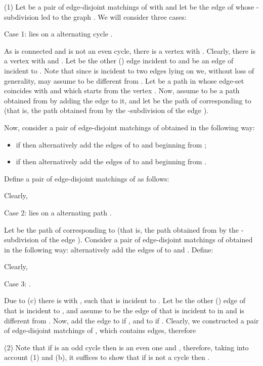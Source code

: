 \documentclass[fleqn,12pt,twoside]{article}
\newenvironment{proof}[1][Proof.]{\begin{trivlist}
\item[\hskip \labelsep {\bfseries #1}]}{\end{trivlist}}
\begin{document}
\begin{proof}
(1) Let  be a pair of edge-disjoint matchings of  with  and let  be the edge of  whose -subdivision led to
the graph . We will consider three cases:

Case 1:  lies on a  alternating
cycle .

As  is connected and is not an even cycle, there is a
vertex  with . Clearly, there is a vertex  with  and . Let  be the other () edge incident to  and  be
an edge of  incident to . Note that since  is incident to
two edges lying
on  we, without loss of generality, may assume  to be different from . Let  be a path in  whose edge-set coincides with  and which starts from the vertex . Now,
assume  to be a path obtained from  by adding the edge
 to it, and let  be the path of 
corresponding to  (that is, the path obtained from  by the
-subdivision of the edge ).

Now, consider a pair of edge-disjoint matchings
 of  obtained in the following
way:

\begin{itemize}
\item if  then alternatively add the edges of 
to  and  beginning from ;

\item if  then alternatively add the edges of  to  and  beginning from
.
\end{itemize}

Define a pair of edge-disjoint matchings  of  as follows:

Clearly,


Case 2:  lies on a  alternating path
.

Let  be the path of  corresponding to 
(that is, the path obtained from  by the -subdivision of the
edge ).
Consider a pair of edge-disjoint matchings  of  obtained in the following way: alternatively add the edges of  to  and . Define:

Clearly,


Case 3: .

Due to (c) there is  with , such that  is
incident to . Let  be the other () edge of  that is
incident to , and assume  to be the edge of
 that is incident to  in  and is
different from . Now, add the edge  to  if
, and to  if . Clearly,
we constructed a pair of edge-disjoint matchings of ,
which contains  edges, therefore

(2) Note that if  is an odd cycle then  is an even one and , therefore, taking into account (1) and (b),
it suffices to show that if  is not a cycle then .


\end{proof}
\end{document}
